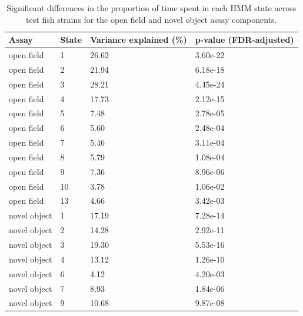 \documentclass[
]{book}
\begin{document}
\begin{table}

\caption{\label{tab:pilot-dge-tbl}Significant differences in the proportion of time spent in each HMM state across test fish strains for the open field and novel object assay components.}
\centering
\begin{tabular}[t]{l|l|l|l}
\hline
Assay & State & Variance explained (\%) & p-value (FDR-adjusted)\\
\hline
open field & 1 & 26.62 & 3.60e-22\\
\hline
open field & 2 & 21.94 & 6.18e-18\\
\hline
open field & 3 & 28.21 & 4.45e-24\\
\hline
open field & 4 & 17.73 & 2.12e-15\\
\hline
open field & 5 & 7.48 & 2.78e-05\\
\hline
open field & 6 & 5.60 & 2.48e-04\\
\hline
open field & 7 & 5.46 & 3.11e-04\\
\hline
open field & 8 & 5.79 & 1.08e-04\\
\hline
open field & 9 & 7.36 & 8.96e-06\\
\hline
open field & 10 & 3.78 & 1.06e-02\\
\hline
open field & 13 & 4.66 & 3.42e-03\\
\hline
novel object & 1 & 17.19 & 7.28e-14\\
\hline
novel object & 2 & 14.28 & 2.92e-11\\
\hline
novel object & 3 & 19.30 & 5.53e-16\\
\hline
novel object & 4 & 13.12 & 1.26e-10\\
\hline
novel object & 6 & 4.12 & 4.20e-03\\
\hline
novel object & 7 & 8.93 & 1.84e-06\\
\hline
novel object & 9 & 10.68 & 9.87e-08\\
\hline
\end{tabular}
\end{table}
\end{document}
